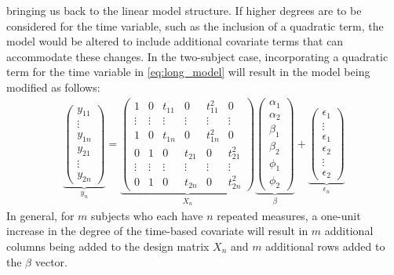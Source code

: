 bringing us back to the linear model structure. If higher degrees are to be considered for the time variable, such as the inclusion of a quadratic term, the model would be altered to include additional covariate terms that can accommodate these changes. In the two-subject case,  incorporating a quadratic term for the time variable in \eqref{eq:long_model} will result in the model being modified as follows: 
\begin{gather}
\nonumber
 \underbrace{\begin{pmatrix} y_{11} \\ \vdots \\ y_{1n} \\ y_{21} \\ \vdots\\ y_{2n} \end{pmatrix}}_{y_n} =
   \underbrace{
   \begin{pmatrix}
   1 & 0 & t_{11} & 0 & t_{11}^2 & 0\\
   \vdots & \vdots & \vdots & \vdots & \vdots & \vdots\\
   1 & 0 & t_{1n} & 0 & t_{1n}^2  & 0\\
   0 & 1 & 0 & t_{21} & 0 & t_{21}^2 \\
   \vdots & \vdots & \vdots & \vdots & \vdots & \vdots \\
   0 & 1 & 0 & t_{2n} & 0 & t_{2n}^2
   \end{pmatrix}
   }_{X_n}
   \underbrace{
      \begin{pmatrix}
         \alpha_{1}\\
         \alpha_{2}\\
         \beta_{1}\\
         \beta_{2}\\
         \phi_{1}\\
         \phi_{2}
      \end{pmatrix}
   }_{\beta}
   + 
   \underbrace{
   \begin{pmatrix}
   \epsilon_{1}\\
   \vdots\\
   \epsilon_{1}\\
   \epsilon_{2}\\
   \vdots\\
   \epsilon_{2}
   \end{pmatrix}
   }_{\epsilon_n}
\end{gather}
In general, for $m$ subjects who each have
$n$ repeated measures, a one-unit increase in the degree of the time-based covariate will
result in $m$ additional columns being added to the  design matrix $X_n$ and $m$ additional rows added to the $\beta$ vector. 

